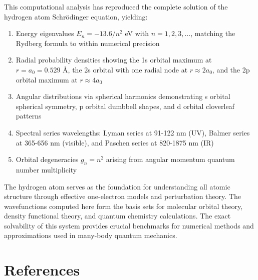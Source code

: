 \documentclass[11pt,a4paper]{article}
\begin{document}
This computational analysis has reproduced the complete solution of the hydrogen atom Schrödinger equation, yielding:

\begin{enumerate}
\item Energy eigenvalues $E_n = -13.6/n^2$ eV with $n = 1, 2, 3, \ldots$, matching the Rydberg formula to within numerical precision
\item Radial probability densities showing the 1s orbital maximum at $r = a_0 = 0.529$ Å, the 2s orbital with one radial node at $r \approx 2a_0$, and the 2p orbital maximum at $r \approx 4a_0$
\item Angular distributions via spherical harmonics demonstrating s orbital spherical symmetry, p orbital dumbbell shapes, and d orbital cloverleaf patterns
\item Spectral series wavelengths: Lyman series at 91-122 nm (UV), Balmer series at 365-656 nm (visible), and Paschen series at 820-1875 nm (IR)
\item Orbital degeneracies $g_n = n^2$ arising from angular momentum quantum number multiplicity
\end{enumerate}

The hydrogen atom serves as the foundation for understanding all atomic structure through effective one-electron models and perturbation theory. The wavefunctions computed here form the basis sets for molecular orbital theory, density functional theory, and quantum chemistry calculations. The exact solvability of this system provides crucial benchmarks for numerical methods and approximations used in many-body quantum mechanics.

\section*{References}
\end{document}
